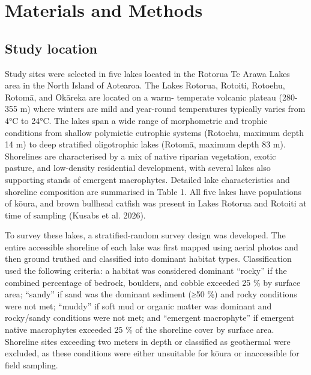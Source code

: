 \documentclass[
  12pt,
  a4paper,
]{scrbook}
\begin{document}

\chapter{Materials and Methods}\label{materials-and-methods-1}

\section{Study location}\label{study-location}

Study sites were selected in five lakes located in the Rotorua Te Arawa
Lakes area in the North Island of Aotearoa. The Lakes Rotorua, Rotoiti,
Rotoehu, Rotomā, and Ōkāreka are located on a warm- temperate volcanic
plateau (280-355 m) where winters are mild and year-round temperatures
typically varies from 4°C to 24°C. The lakes span a wide range of
morphometric and trophic conditions from shallow polymictic eutrophic
systems (Rotoehu, maximum depth 14 m) to deep stratified oligotrophic
lakes (Rotomā, maximum depth 83 m). Shorelines are characterised by a
mix of native riparian vegetation, exotic pasture, and low-density
residential development, with several lakes also supporting stands of
emergent macrophytes. Detailed lake characteristics and shoreline
composition are summarised in Table 1. All five lakes have populations
of kōura, and brown bullhead catfish was present in Lakes Rotorua and
Rotoiti at time of sampling (Kusabs et al. 2026).

To survey these lakes, a stratified-random survey design was developed.
The entire accessible shoreline of each lake was first mapped using
aerial photos and then ground truthed and classified into dominant
habitat types. Classification used the following criteria: a habitat was
considered dominant ``rocky'' if the combined percentage of bedrock,
boulders, and cobble exceeded 25 \% by surface area; ``sandy'' if sand
was the dominant sediment (≥50 \%) and rocky conditions were not met;
``muddy'' if soft mud or organic matter was dominant and rocky/sandy
conditions were not met; and ``emergent macrophyte'' if emergent native
macrophytes exceeded 25 \% of the shoreline cover by surface area.
Shoreline sites exceeding two meters in depth or classified as
geothermal were excluded, as these conditions were either unsuitable for
kōura or inaccessible for field sampling.
\end{document}
